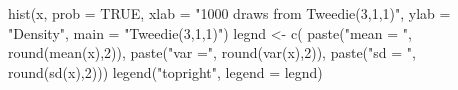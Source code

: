 \begin{Schunk}
\begin{Sinput}
  hist(x, prob = TRUE, xlab = "1000 draws from Tweedie(3,1,1)", ylab = "Density", main = "Tweedie(3,1,1)")
  legnd <- c( paste("mean = ", round(mean(x),2)), paste("var =", round(var(x),2)), paste("sd = ", round(sd(x),2)))
  legend("topright", legend = legnd)
\end{Sinput}
\end{Schunk}
